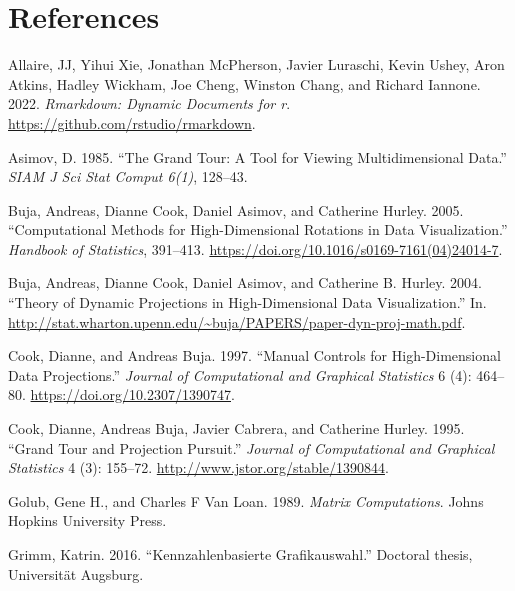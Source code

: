 \documentclass{article}
\newlength{\cslhangindent}
\newlength{\cslentryspacingunit} %
\newenvironment{CSLReferences}[2] %
 {%
  \setlength{\parindent}{0pt}
  \ifodd #1
  \let\oldpar\par
  \def\par{\hangindent=\cslhangindent\oldpar}
  \fi
  \setlength{\parskip}{#2\cslentryspacingunit}
 }%
 {}
\begin{document}
\hypertarget{references}{%
\section*{References}\label{references}}

\hypertarget{refs}{}
\begin{CSLReferences}{1}{0}
\leavevmode{}%
Allaire, JJ, Yihui Xie, Jonathan McPherson, Javier Luraschi, Kevin
Ushey, Aron Atkins, Hadley Wickham, Joe Cheng, Winston Chang, and
Richard Iannone. 2022. \emph{Rmarkdown: Dynamic Documents for r}.
\url{https://github.com/rstudio/rmarkdown}.

\leavevmode{}%
Asimov, D. 1985. {``The Grand Tour: A Tool for Viewing Multidimensional
Data.''} \emph{SIAM J Sci Stat Comput 6(1)}, 128--43.

\leavevmode{}%
Buja, Andreas, Dianne Cook, Daniel Asimov, and Catherine Hurley. 2005.
{``Computational Methods for High-Dimensional Rotations in Data
Visualization.''} \emph{Handbook of Statistics}, 391--413.
\url{https://doi.org/10.1016/s0169-7161(04)24014-7}.

\leavevmode{}%
Buja, Andreas, Dianne Cook, Daniel Asimov, and Catherine B. Hurley.
2004. {``Theory of Dynamic Projections in High-Dimensional Data
Visualization.''} In.
\url{http://stat.wharton.upenn.edu/~buja/PAPERS/paper-dyn-proj-math.pdf}.

\leavevmode{}%
Cook, Dianne, and Andreas Buja. 1997. {``Manual Controls for
High-Dimensional Data Projections.''} \emph{Journal of Computational and
Graphical Statistics} 6 (4): 464--80.
\url{https://doi.org/10.2307/1390747}.

\leavevmode{}%
Cook, Dianne, Andreas Buja, Javier Cabrera, and Catherine Hurley. 1995.
{``Grand Tour and Projection Pursuit.''} \emph{Journal of Computational
and Graphical Statistics} 4 (3): 155--72.
\url{http://www.jstor.org/stable/1390844}.

\leavevmode{}%
Golub, Gene H., and Charles F Van Loan. 1989. \emph{Matrix
Computations}. Johns Hopkins University Press.

\leavevmode{}%
Grimm, Katrin. 2016. {``Kennzahlenbasierte Grafikauswahl.''} Doctoral
thesis, Universit{ä}t Augsburg.


\end{CSLReferences}
\end{document}

